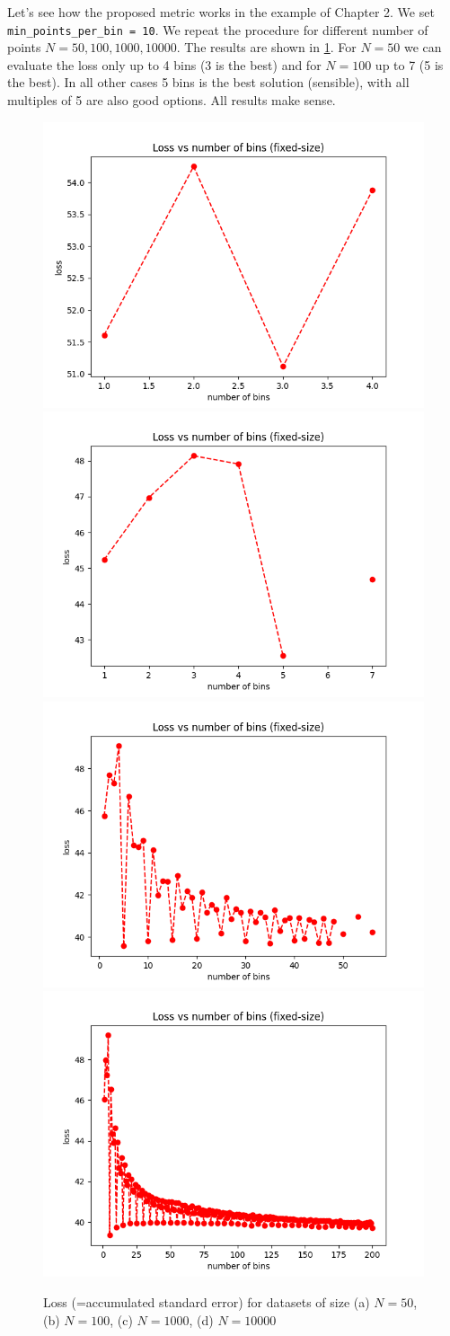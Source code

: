 \documentclass{article}
\begin{document}
Let's see how the proposed metric works in the example of Chapter
2. We set \texttt{min\_points\_per\_bin = 10}. We repeat the procedure
for different number of points \(N=50, 100, 1000, 10000\). The results
are shown in \ref{fig:bullet-2-im-1}. For \(N=50\) we can evaluate the
loss only up to 4 bins (3 is the best) and for \(N=100\) up to 7 (5 is
the best). In all other cases 5 bins is the best solution (sensible),
with all multiples of 5 are also good options. All results make sense.


\begin{figure}[!h]
  \centering
  \includegraphics[width=.49\linewidth]{bullet_2/im_1.png}
  \includegraphics[width=.49\linewidth]{bullet_2/im_2.png}\\
  \includegraphics[width=.49\linewidth]{bullet_2/im_3.png}
  \includegraphics[width=.49\linewidth]{bullet_2/im_4.png}
  \caption{Loss (=accumulated standard error) for datasets of size (a)
    \(N = 50\), (b) \(N = 100\), (c) \(N = 1000\), (d) \(N = 10000\)}
  \label{fig:bullet-2-im-1}
\end{figure}
\end{document}
